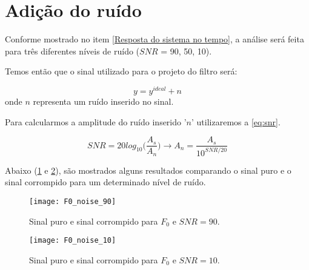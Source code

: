 \clearpage \section{Adição do ruído}

Conforme mostrado no item \ref{Resposta do sistema no tempo}, a análise será feita para três diferentes níveis de ruído ($ SNR $ = 90, 50, 10). 

Temos então que o sinal utilizado para o projeto do filtro será:

\begin{equation}
y = y^{ideal} + n
\end{equation}
onde $ n $ representa um ruído inserido no sinal.

Para calcularmos a amplitude do ruído inserido '$ n $' utilizaremos a \cref{eq:snr}.

\begin{equation} \label{eq:snr}
SNR = 20log_{10}\Bigg(\frac{A_s}{A_n}\Bigg) \rightarrow A_n = \frac{A_s}{10^{SNR/20}}
\end{equation}

Abaixo (\cref{fig:F0_noise_90} e \cref{fig:F0_noise_10}), são mostrados alguns resultados comparando o sinal puro e o sinal corrompido para um determinado nível de ruído.

\begin{figure}[h]
	\centering
	\texttt{[image: F0\_noise\_90]}
	\caption{Sinal puro e sinal corrompido para $ F_0 $ e $ SNR=90 $.}
	\label{fig:F0_noise_90}
\end{figure}

\begin{figure}
	\centering
	\texttt{[image: F0\_noise\_10]}
	\caption{Sinal puro e sinal corrompido para $ F_0 $ e $ SNR=10 $.}
	\label{fig:F0_noise_10}
\end{figure}
